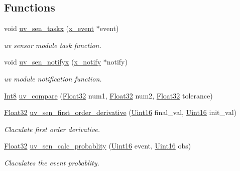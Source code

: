\subsection*{Functions}
\begin{DoxyCompactItemize}
\item 
void \hyperlink{a00073_ab4e931568892f0b46a2571d3c480f5c8}{uv\+\_\+sen\+\_\+taskx} (\hyperlink{a00036_de/d37/a00849}{x\+\_\+event} $\ast$event)
\begin{DoxyCompactList}\small\item\em uv sensor module task function. \end{DoxyCompactList}\item 
void \hyperlink{a00073_ae2617634df4d3055161f7fb1f148f6da}{uv\+\_\+sen\+\_\+notifyx} (\hyperlink{a00036_df/d4c/a00851}{x\+\_\+notify} $\ast$notify)
\begin{DoxyCompactList}\small\item\em uv module notification function. \end{DoxyCompactList}\item 
\hyperlink{a00072_a7e31ca7716b8d85dd473450a5c5e5a97}{Int8} \hyperlink{a00073_ab0455c506c72d05d43b1f2e8f3540b47}{uv\+\_\+compare} (\hyperlink{a00072_a87d38f886e617ced2698fc55afa07637}{Float32} num1, \hyperlink{a00072_a87d38f886e617ced2698fc55afa07637}{Float32} num2, \hyperlink{a00072_a87d38f886e617ced2698fc55afa07637}{Float32} tolerance)
\item 
\hyperlink{a00072_a87d38f886e617ced2698fc55afa07637}{Float32} \hyperlink{a00073_ae4600a772ff6ca64c4e169e726623058}{uv\+\_\+sen\+\_\+first\+\_\+order\+\_\+derivative} (\hyperlink{a00072_a59a9f6be4562c327cbfb4f7e8e18f08b}{Uint16} final\+\_\+val, \hyperlink{a00072_a59a9f6be4562c327cbfb4f7e8e18f08b}{Uint16} init\+\_\+val)
\begin{DoxyCompactList}\small\item\em Claculate first order derivative. \end{DoxyCompactList}\item 
\hyperlink{a00072_a87d38f886e617ced2698fc55afa07637}{Float32} \hyperlink{a00073_a252304c3c6703a4e94f39c17d0be256b}{uv\+\_\+sen\+\_\+calc\+\_\+probablity} (\hyperlink{a00072_a59a9f6be4562c327cbfb4f7e8e18f08b}{Uint16} event, \hyperlink{a00072_a59a9f6be4562c327cbfb4f7e8e18f08b}{Uint16} obs)
\begin{DoxyCompactList}\small\item\em Claculates the event probablity. \end{DoxyCompactList}\item 

\end{DoxyCompactItemize}
